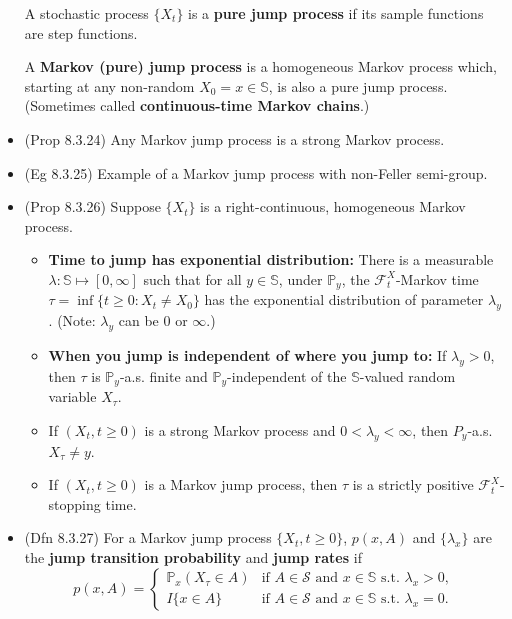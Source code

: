 \documentclass[twoside]{article}
\newcommand\bbP{\mathbb{P}}
\newcommand\bbS{\mathbb{S}}
\newcommand\calF{\mathcal{F}}
\newcommand\calS{\mathcal{S}}
\newcommand\lmb{\lambda}
\begin{document}
\begin{itemize}
A stochastic process $\{ X_t\}$ is a \textbf{pure jump process} if its sample functions are step functions.

A \textbf{Markov (pure) jump process} is a homogeneous Markov process which, starting at any non-random $X_0 = x \in \bbS$, is also a pure jump process. (Sometimes called \textbf{continuous-time Markov chains}.)

\item (Prop 8.3.24) Any Markov jump process is a strong Markov process.

\item (Eg 8.3.25) Example of a Markov jump process with non-Feller semi-group.

\item (Prop 8.3.26) Suppose $\{ X_t\}$ is a right-continuous, homogeneous Markov process.
\begin{itemize}
\item \textbf{Time to jump has exponential distribution:} There is a measurable $\lmb: \bbS \mapsto [0,\infty]$ such that for all $y \in \bbS$, under $\bbP_y$, the $\calF_t^X$-Markov time $\tau = \inf \{ t \geq 0: X_t \neq X_0\}$ has the exponential distribution of parameter $\lmb_y$. (Note: $\lmb_y$ can be $0$ or $\infty$.)

\item \textbf{When you jump is independent of where you jump to:} If $\lmb_y > 0$, then $\tau$ is $\bbP_y$-a.s. finite and $\bbP_y$-independent of the $\bbS$-valued random variable $X_\tau$.

\item If $(X_t, t \geq 0)$ is a strong Markov process and $0 < \lmb_y < \infty$, then $P_y$-a.s. $X_\tau \neq y$.

\item If $(X_t, t \geq 0)$ is a Markov jump process, then $\tau$ is a strictly positive $\calF_t^X$-stopping time.
\end{itemize}

\item (Dfn 8.3.27) For a Markov jump process $\{ X_t, t \geq 0\}$, $p(x,A)$ and $\{ \lmb_x \}$ are the \textbf{jump transition probability} and \textbf{jump rates} if 
\[p(x,A) = \begin{cases} \bbP_x(X_\tau \in A) &\text{if } A \in \calS \text{ and } x \in \bbS \text{ s.t. } \lmb_x > 0, \\ 
I\{x \in A \} &\text{if } A \in \calS \text{ and } x \in \bbS \text{ s.t. } \lmb_x = 0. \end{cases} \]


\end{itemize}
\end{document}
